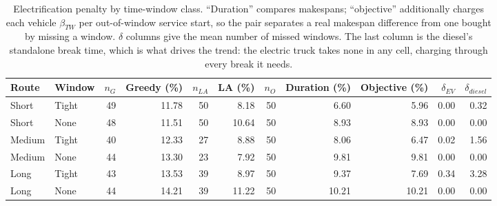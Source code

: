 \begin{table}[ht]\centering
\caption{Electrification penalty by time-window class.  ``Duration'' compares makespans; ``objective'' additionally charges each vehicle $\beta_{TW}$ per out-of-window service start, so the pair separates a real makespan difference from one bought by missing a window.  $\delta$ columns give the mean number of missed windows.  The last column is the diesel's standalone break time, which is what drives the trend: the electric truck takes none in any cell, charging through every break it needs.}
\label{tab:diesel-tw}
\begin{tabular}{llrrrrrrrrr}
\hline
Route & Window & $n_G$ & Greedy (\%) & $n_{LA}$ & LA (\%) & $n_O$ & Duration (\%) & Objective (\%) & $\delta_{EV}$ & $\delta_{diesel}$ \\
\hline
Short & Tight & 49 & 11.78 & 50 & 8.18 & 50 & 6.60 & 5.96 & 0.00 & 0.32 \\
Short & None & 48 & 11.51 & 50 & 10.64 & 50 & 8.93 & 8.93 & 0.00 & 0.00 \\
Medium & Tight & 40 & 12.33 & 27 & 8.88 & 50 & 8.06 & 6.47 & 0.02 & 1.56 \\
Medium & None & 44 & 13.30 & 23 & 7.92 & 50 & 9.81 & 9.81 & 0.00 & 0.00 \\
Long & Tight & 43 & 13.53 & 39 & 8.97 & 50 & 9.37 & 7.69 & 0.34 & 3.28 \\
Long & None & 44 & 14.21 & 39 & 11.22 & 50 & 10.21 & 10.21 & 0.00 & 0.00 \\
\hline
\end{tabular}
\end{table}

